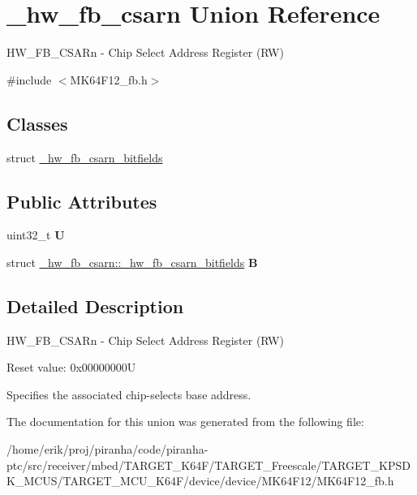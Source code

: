 \hypertarget{union__hw__fb__csarn}{}\section{\+\_\+hw\+\_\+fb\+\_\+csarn Union Reference}
\label{union__hw__fb__csarn}


H\+W\+\_\+\+F\+B\+\_\+\+C\+S\+A\+Rn -\/ Chip Select Address Register (RW)  




{\ttfamily \#include $<$M\+K64\+F12\+\_\+fb.\+h$>$}

\subsection*{Classes}
\begin{DoxyCompactItemize}
\item 
struct \hyperlink{struct__hw__fb__csarn_1_1__hw__fb__csarn__bitfields}{\+\_\+hw\+\_\+fb\+\_\+csarn\+\_\+bitfields}
\end{DoxyCompactItemize}
\subsection*{Public Attributes}
\begin{DoxyCompactItemize}
\item 
uint32\+\_\+t {\bfseries U}\hypertarget{union__hw__fb__csarn_a4e12f0a68ba8e71f525a62b143a80071}{}\label{union__hw__fb__csarn_a4e12f0a68ba8e71f525a62b143a80071}

\item 
struct \hyperlink{struct__hw__fb__csarn_1_1__hw__fb__csarn__bitfields}{\+\_\+hw\+\_\+fb\+\_\+csarn\+::\+\_\+hw\+\_\+fb\+\_\+csarn\+\_\+bitfields} {\bfseries B}\hypertarget{union__hw__fb__csarn_a3358ab0fe98610a890841598943b483a}{}\label{union__hw__fb__csarn_a3358ab0fe98610a890841598943b483a}

\end{DoxyCompactItemize}


\subsection{Detailed Description}
H\+W\+\_\+\+F\+B\+\_\+\+C\+S\+A\+Rn -\/ Chip Select Address Register (RW) 

Reset value\+: 0x00000000U

Specifies the associated chip-\/select\textquotesingle{}s base address. 

The documentation for this union was generated from the following file\+:\begin{DoxyCompactItemize}
\item 
/home/erik/proj/piranha/code/piranha-\/ptc/src/receiver/mbed/\+T\+A\+R\+G\+E\+T\+\_\+\+K64\+F/\+T\+A\+R\+G\+E\+T\+\_\+\+Freescale/\+T\+A\+R\+G\+E\+T\+\_\+\+K\+P\+S\+D\+K\+\_\+\+M\+C\+U\+S/\+T\+A\+R\+G\+E\+T\+\_\+\+M\+C\+U\+\_\+\+K64\+F/device/device/\+M\+K64\+F12/M\+K64\+F12\+\_\+fb.\+h\end{DoxyCompactItemize}
